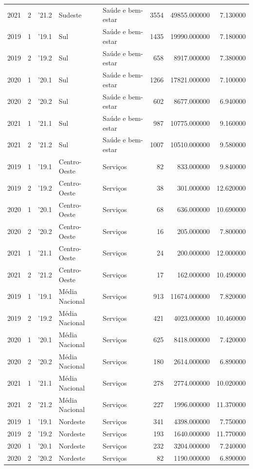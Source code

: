 \begin{longtable}{rrlllrrr}
2021 & 2 & '21.2 & Sudeste & Saúde e bem-estar & 3554 & 49855.000000 & 7.130000 \\
2019 & 1 & '19.1 & Sul & Saúde e bem-estar & 1435 & 19990.000000 & 7.180000 \\
2019 & 2 & '19.2 & Sul & Saúde e bem-estar & 658 & 8917.000000 & 7.380000 \\
2020 & 1 & '20.1 & Sul & Saúde e bem-estar & 1266 & 17821.000000 & 7.100000 \\
2020 & 2 & '20.2 & Sul & Saúde e bem-estar & 602 & 8677.000000 & 6.940000 \\
2021 & 1 & '21.1 & Sul & Saúde e bem-estar & 987 & 10775.000000 & 9.160000 \\
2021 & 2 & '21.2 & Sul & Saúde e bem-estar & 1007 & 10510.000000 & 9.580000 \\
2019 & 1 & '19.1 & Centro-Oeste & Serviços & 82 & 833.000000 & 9.840000 \\
2019 & 2 & '19.2 & Centro-Oeste & Serviços & 38 & 301.000000 & 12.620000 \\
2020 & 1 & '20.1 & Centro-Oeste & Serviços & 68 & 636.000000 & 10.690000 \\
2020 & 2 & '20.2 & Centro-Oeste & Serviços & 16 & 205.000000 & 7.800000 \\
2021 & 1 & '21.1 & Centro-Oeste & Serviços & 24 & 200.000000 & 12.000000 \\
2021 & 2 & '21.2 & Centro-Oeste & Serviços & 17 & 162.000000 & 10.490000 \\
2019 & 1 & '19.1 & Média Nacional & Serviços & 913 & 11674.000000 & 7.820000 \\
2019 & 2 & '19.2 & Média Nacional & Serviços & 421 & 4023.000000 & 10.460000 \\
2020 & 1 & '20.1 & Média Nacional & Serviços & 625 & 8418.000000 & 7.420000 \\
2020 & 2 & '20.2 & Média Nacional & Serviços & 180 & 2614.000000 & 6.890000 \\
2021 & 1 & '21.1 & Média Nacional & Serviços & 278 & 2774.000000 & 10.020000 \\
2021 & 2 & '21.2 & Média Nacional & Serviços & 227 & 1996.000000 & 11.370000 \\
2019 & 1 & '19.1 & Nordeste & Serviços & 341 & 4398.000000 & 7.750000 \\
2019 & 2 & '19.2 & Nordeste & Serviços & 193 & 1640.000000 & 11.770000 \\
2020 & 1 & '20.1 & Nordeste & Serviços & 232 & 3204.000000 & 7.240000 \\
2020 & 2 & '20.2 & Nordeste & Serviços & 82 & 1190.000000 & 6.890000 \\

\end{longtable}

